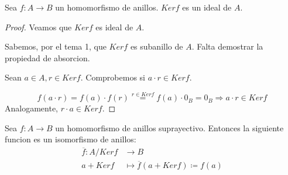 \begin{proposition}
	Sea \(f \colon A \to B \) un homomorfismo de anillos. \(Kerf \) es un ideal de \(A \).
\end{proposition}
\begin{proof}
	Veamos que \(Kerf \) es ideal de \(A \).
	
	Sabemos, por el tema 1, que \(Kerf \) es subanillo de \(A \). Falta demostrar la propiedad de absorcion.
	
	Sean \(a \in A, r \in Kerf \). Comprobemos si \(a \cdot r \in Kerf \).
	
	\[
		f(a \cdot r) = f(a) \cdot f(r) \overset{r \in Kerf}{=} f(a) \cdot 0_B = 0_B \Rightarrow a\cdot r \in Kerf
	\]
	Analogamente, \(r \cdot a \in Kerf\).
\end{proof}
\begin{theorem}
	Sea \(f \colon A \to B \) un homomorfismo de anillos suprayectivo. Entonces la siguiente funcion es un isomorfismo de anillos:
	\[
		\begin{aligned}
			\overline{f} \colon A/Kerf & \longrightarrow B                                    \\
			a + Kerf                   & \longmapsto \overline{f} (a + Kerf) \coloneqq  f(a)
		\end{aligned}
	\]
	
\end{theorem}
